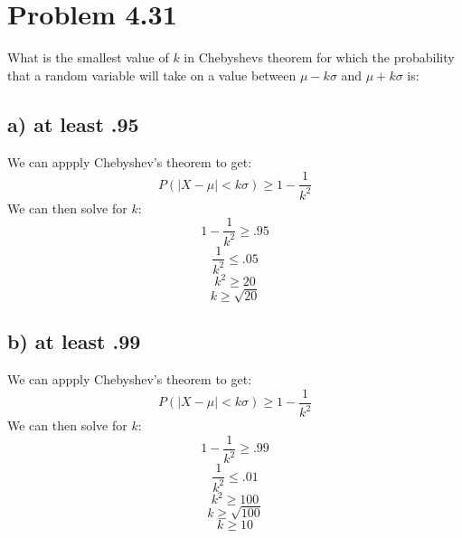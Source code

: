 \documentclass{article}
\begin{document}
\section*{Problem 4.31}
What is the smallest value of $k$ in Chebyshevs theorem for which the probability that a random variable will take on a value between $\mu - k\sigma$ and $\mu + k\sigma$ is:
\subsection*{a) at least .95}
We can appply Chebyshev's theorem to get:
$$ P(|X - \mu| < k\sigma) \geq 1 - \frac{1}{k^2} $$
We can then solve for $k$:
$$ 1 - \frac{1}{k^2} \geq .95 $$
$$ \frac{1}{k^2} \leq .05 $$
$$ k^2 \geq 20 $$
$$ k \geq \sqrt{20} $$

\subsection*{b) at least .99}
We can appply Chebyshev's theorem to get:
$$ P(|X - \mu| < k\sigma) \geq 1 - \frac{1}{k^2} $$
We can then solve for $k$:
$$ 1 - \frac{1}{k^2} \geq .99 $$
$$ \frac{1}{k^2} \leq .01 $$
$$ k^2 \geq 100 $$
$$ k \geq \sqrt{100} $$
$$ k \geq 10 $$
\end{document}
